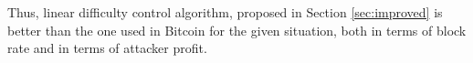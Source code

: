 \documentclass[]{llncs}
\begin{document}
Thus, linear difficulty control algorithm, proposed in Section \ref{sec:improved} is better than the one used in Bitcoin for the given situation, both in terms of block rate and in terms of attacker profit.








\end{document}
